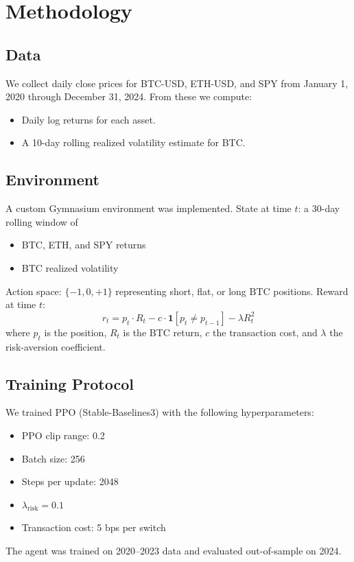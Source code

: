 \documentclass[12pt]{article}
\begin{document}
\section{Methodology}
\subsection{Data}
We collect daily close prices for BTC-USD, ETH-USD, and SPY from January 1, 2020 through December 31, 2024. From these we compute:
\begin{itemize}
    \item Daily log returns for each asset.
    \item A 10-day rolling realized volatility estimate for BTC.
\end{itemize}

\subsection{Environment}
A custom Gymnasium environment was implemented.  
State at time $t$: a 30-day rolling window of
\begin{itemize}
    \item BTC, ETH, and SPY returns
    \item BTC realized volatility
\end{itemize}

Action space: $\{-1, 0, +1\}$ representing short, flat, or long BTC positions.  
Reward at time $t$:
\begin{equation}
r_t = p_t \cdot R_t - c \cdot \mathbf{1}[p_t \neq p_{t-1}] - \lambda R_t^2
\end{equation}
where $p_t$ is the position, $R_t$ is the BTC return, $c$ the transaction cost, and $\lambda$ the risk-aversion coefficient.

\subsection{Training Protocol}
We trained PPO (Stable-Baselines3) with the following hyperparameters:
\begin{itemize}
    \item PPO clip range: 0.2
    \item Batch size: 256
    \item Steps per update: 2048
    \item $\lambda_{\text{risk}} = 0.1$
    \item Transaction cost: 5 bps per switch
\end{itemize}
The agent was trained on 2020--2023 data and evaluated out-of-sample on 2024.
\end{document}
